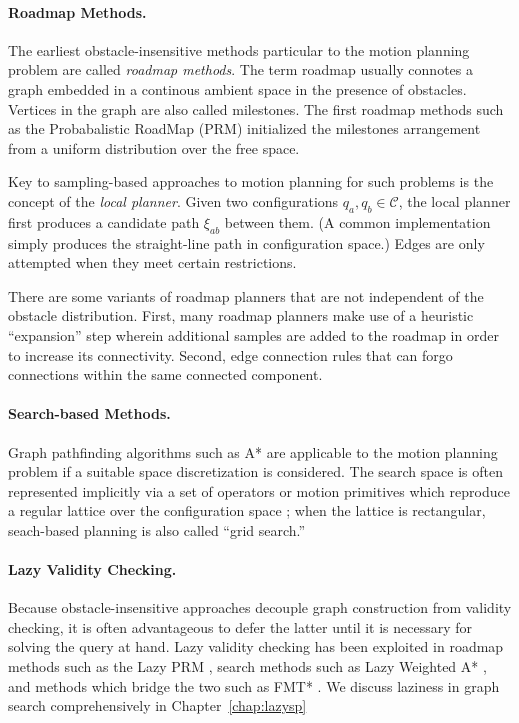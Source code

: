 \paragraph{Roadmap Methods.}

The earliest obstacle-insensitive methods particular to the motion
planning problem are called \emph{roadmap methods}.
The term roadmap usually connotes a graph embedded in a continous
ambient space in the presence of obstacles.
Vertices in the graph are also called milestones.
The first roadmap methods such as the
Probabalistic RoadMap (PRM) \citep{kavrakietal1996prm}
initialized the milestones arrangement
from a uniform distribution over the free space.

Key to sampling-based approaches
to motion planning for such problems
is the concept of the \emph{local planner}.
Given two configurations $q_a, q_b \in \mathcal{C}$,
the local planner first produces a candidate path $\xi_{ab}$ between
them.
(A common implementation simply produces the straight-line path
in configuration space.)
Edges are only attempted when they meet certain restrictions.

There are some variants of roadmap planners that are not independent
of the obstacle distribution.
First,
many roadmap planners make use of a heuristic ``expansion'' step
wherein additional samples are added to the roadmap
in order to increase its connectivity.
Second,
edge connection rules that can forgo connections within
the same connected component.


\paragraph{Search-based Methods.}
Graph pathfinding algorithms such as A* \citep{hart1968astar}
are applicable to the motion planning problem if a suitable
space discretization is considered.
The search space is often represented implicitly via a set of
operators or motion primitives
which reproduce a regular lattice over the configuration space
\citep{pivtoraiko2005statelattice};
when the lattice is rectangular,
seach-based planning is also called ``grid search.''

\paragraph{Lazy Validity Checking.}
Because obstacle-insensitive approaches decouple graph construction
from validity checking,
it is often advantageous to defer the latter until it is
necessary for solving the query at hand.
Lazy validity checking has been exploited
in roadmap methods such as the Lazy PRM
\citep{bohlin2000lazyprm, hauser2015lazy},
search methods such as Lazy Weighted A* \citep{cohen2014narms},
and methods which bridge the two such as FMT* \citep{janson2015fmtstar}.
We discuss laziness in graph search comprehensively
in Chapter~\ref{chap:lazysp}

